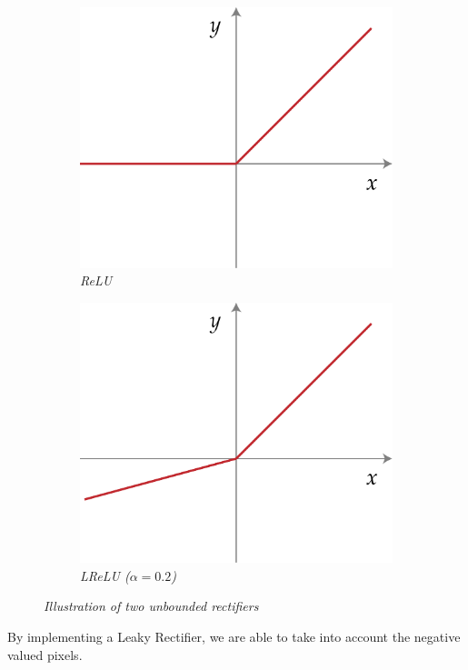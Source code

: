 \documentclass{article}
\begin{document}
            \begin{figure}[!ht]
                \begin{subfigure}{.49\linewidth}
                    \centering
                    \includegraphics[width=.7\linewidth]{pics/act-relu.png}
                    \caption{\textit{ReLU}}
                    \label{fig:relu}
                \end{subfigure}
                \begin{subfigure}{.49\linewidth}
                    \centering
                    \includegraphics[width=.7\linewidth]{pics/act-lrelu.png}
                    \caption{\textit{LReLU ($\alpha=0.2$)}}
                    \label{fig:lrelu}
                \end{subfigure}
                \caption{\textit{Illustration of two unbounded rectifiers}}
            \end{figure}

            By implementing a Leaky Rectifier, we are able to take into account the negative valued pixels.
\end{document}
